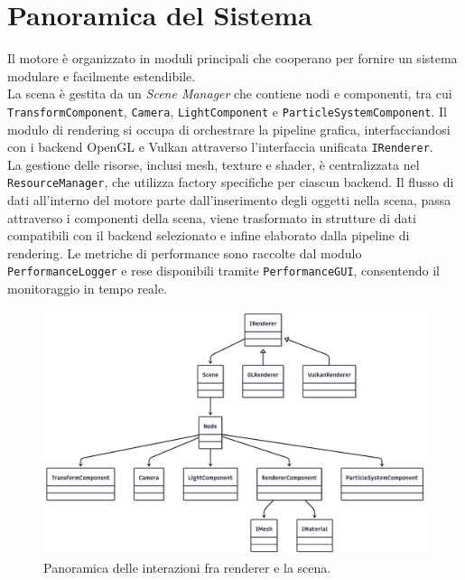 \documentclass[12pt,a4paper,openright,twoside]{book}
\begin{document}
\section{Panoramica del Sistema}
Il motore è organizzato in moduli principali che cooperano per fornire un sistema modulare e facilmente estendibile. \\
La scena è gestita da un \emph{Scene Manager} che contiene nodi e componenti, tra cui \texttt{TransformComponent},
\texttt{Camera}, \texttt{LightComponent} e \texttt{ParticleSystemComponent}. Il modulo di rendering si occupa di
orchestrare la pipeline grafica, interfacciandosi con i backend OpenGL e Vulkan attraverso l'interfaccia unificata
\texttt{IRenderer}. \\

La gestione delle risorse, inclusi mesh, texture e shader, è centralizzata nel \texttt{ResourceManager}, che utilizza
factory specifiche per ciascun backend.
Il flusso di dati all'interno del motore parte dall'inserimento degli oggetti nella scena, passa attraverso i componenti
della scena, viene trasformato in strutture di dati compatibili con il backend selezionato e infine elaborato dalla
pipeline di rendering. Le metriche di performance sono raccolte dal modulo \texttt{PerformanceLogger} e rese disponibili
tramite \texttt{PerformanceGUI}, consentendo il monitoraggio in tempo reale.
\begin{figure}[H]
   \centering
   \includegraphics[width=.8\linewidth]{figures/uml_scene_renderer.png}
   \caption{Panoramica delle interazioni fra renderer e la scena.}
   \label{fig:uml-scene-renderer}
\end{figure}
\end{document}
